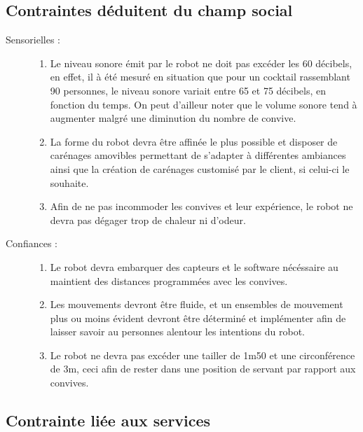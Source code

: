 \subsection{Contraintes déduitent du champ social}

\begin{description}
\item[Sensorielles :]
  \begin{enumerate}
  \item Le niveau sonore émit par le robot ne doit pas excéder les 60
    décibels, en effet, il à été mesuré en situation que pour un
    cocktail rassemblant 90 personnes, le niveau sonore variait entre
    65 et 75 décibels, en fonction du temps. On peut d'ailleur noter
    que le volume sonore tend à augmenter malgré une diminution du
    nombre de convive.
  \item La forme du robot devra être affinée le plus possible et
    disposer de carénages amovibles permettant de s'adapter à
    différentes ambiances ainsi que la création de carénages customisé
    par le client, si celui-ci le souhaite.
  \item Afin de ne pas incommoder les convives et leur expérience, le
    robot ne devra pas dégager trop de chaleur ni d'odeur.
  \end{enumerate}
\item[Confiances :]
  \begin{enumerate}
  \item Le robot devra embarquer des capteurs et le software
    nécéssaire au maintient des distances programmées avec les
    convives.
  \item Les mouvements devront être fluide, et un ensembles de
    mouvement plus ou moins évident devront être déterminé et
    implémenter afin de laisser savoir au personnes alentour les
    intentions du robot.
  \item Le robot ne devra pas excéder une tailler de 1m50 et une
    circonférence de 3m, ceci afin de rester dans une position de
    servant par rapport aux convives.
  \end{enumerate}
\end{description}


\subsection{Contrainte liée aux services}

